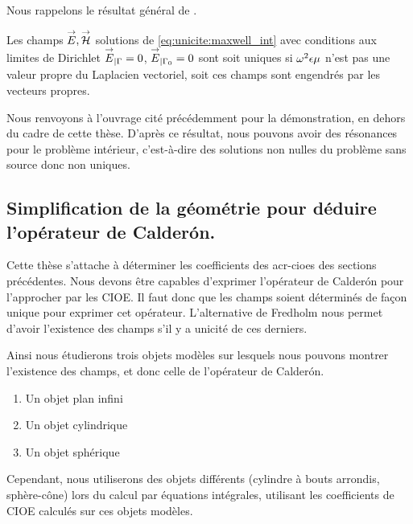     Nous rappelons le résultat général de \cite[Théorème~8, p.~111]{cessenat_mathematical_1996}.
    \begin{thm}
      Les champs \(\vE,\vH\) solutions de \eqref{eq:unicite:maxwell_int} avec conditions aux limites de Dirichlet \(\vE_{|\Gamma} = 0\), \(\vE_{|\Gamma_0} = 0\) sont soit uniques si \(\w^2\eps\mu\) n'est pas une valeur propre du Laplacien vectoriel, soit ces champs sont engendrés par les vecteurs propres.
    \end{thm}
    Nous renvoyons à l'ouvrage cité précédemment pour la démonstration, en dehors du cadre de cette thèse.
    D'après ce résultat, nous pouvons avoir des résonances pour le problème intérieur, c'est-à-dire des solutions non nulles du problème sans source donc non uniques.

  \subsection{Simplification de la géométrie  pour déduire l'opérateur de Calderón.}
    Cette thèse s'attache à déterminer les coefficients des \glspl{acr-cioe} des sections précédentes.
    Nous devons être capables d'exprimer l'opérateur de Calderón pour l'approcher par les CIOE.
    Il faut donc que les champs soient déterminés de façon unique pour exprimer cet opérateur.
    L'alternative de Fredholm nous permet d'avoir l'existence des champs s'il y a unicité de ces derniers.

    Ainsi nous étudierons trois objets modèles sur lesquels nous pouvons montrer l'existence des champs, et donc celle de l'opérateur de Calderón.

    \begin{enumerate}
      \item Un objet plan infini 
      \item Un objet cylindrique
      \item Un objet sphérique
    \end{enumerate}
   
    Cependant, nous utiliserons des objets différents (cylindre à bouts arrondis, sphère-cône) lors du calcul par équations intégrales, utilisant les coefficients de CIOE calculés sur ces objets modèles.

    \begin{figure}[h!btp]
        \centering
        \begin{tikzpicture}
            
        \end{tikzpicture}
    \end{figure}


